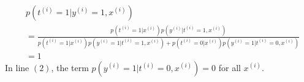 \begin{answer}
	
\begin{align}
	& p(t^{(i)} = 1|y^{(i)} = 1, x^{(i)}) \\
	&= \frac{p(t^{(i)} = 1|x^{(i)}) p(y^{(i)}|t^{(i)} = 1, x^{(i)})}{p(t^{(i)} = 1|x^{(i)}) p(y^{(i)} = 1|t^{(i)} = 1, x^{(i)}) + p(t^{(i)} = 0|x^{(i)}) p(y^{(i)} = 1|t^{(i)} = 0, x^{(i)})} \\
	&= 1
\end{align}	
%
In line $(2)$, the term $p(y^{(i)} = 1|t^{(i)} = 0, x^{(i)}) = 0$ for all $x^{(i)}$. 	
\end{answer}
